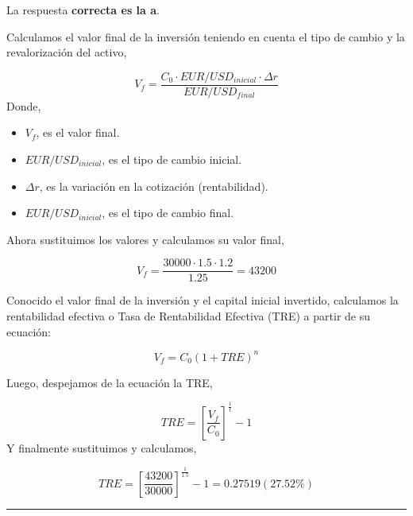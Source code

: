 \documentclass[
  letterpaper,
  DIV=11,
  numbers=noendperiod]{scrreprt}
\begin{document}
\begin{tcolorbox}[enhanced jigsaw, left=2mm, opacityback=0, colback=white, breakable, arc=.35mm, bottomrule=.15mm, rightrule=.15mm, toprule=.15mm, leftrule=.75mm, colframe=quarto-callout-tip-color-frame]
\begin{minipage}[t]{5.5mm}
\textcolor{quarto-callout-tip-color}{\faLightbulb}
\end{minipage}%
\begin{minipage}[t]{\textwidth - 5.5mm}

La respuesta \textbf{correcta es la a}.

Calculamos el valor final de la inversión teniendo en cuenta el tipo de
cambio y la revalorización del activo,

\[V_f=\frac{C_0\cdot{EUR}/{USD}_{inicial}\cdot\Delta r}{{EUR}/{USD}_{final}}\]
Donde,

\begin{itemize}
\item
  \(V_f\), es el valor final.
\item
  \({EUR}/{USD}_{inicial}\), es el tipo de cambio inicial.
\item
  \(\Delta r\), es la variación en la cotización (rentabilidad).
\item
  \({EUR}/{USD}_{inicial}\), es el tipo de cambio final.
\end{itemize}

Ahora sustituimos los valores y calculamos su valor final,

\[V_f=\frac{30000\cdot1.5\cdot1.2}{1.25}=43200\]

Conocido el valor final de la inversión y el capital inicial invertido,
calculamos la rentabilidad efectiva o Tasa de Rentabilidad Efectiva
(TRE) a partir de su ecuación:

\[{ V }_{ f }={ C }_{ 0 }{ (1+TRE) }^{ n }\]

Luego, despejamos de la ecuación la TRE,

\[{ { { TRE=}\left[ \frac { { V}_{ f } }{ { C }_{ 0 } }  \right]  }^{ \frac { 1 }{ t }  } }-1\]
Y finalmente sustituimos y calculamos,

\[{ { { TRE=}\left[ \frac { 43200 }{ 30000 }  \right]  }^{ \frac { 1 }{ 1.5 }  } }-1=0.27519(27.52\%)\]

\end{minipage}%
\end{tcolorbox}

\begin{center}\rule{0.5\linewidth}{0.5pt}\end{center}
\end{document}

